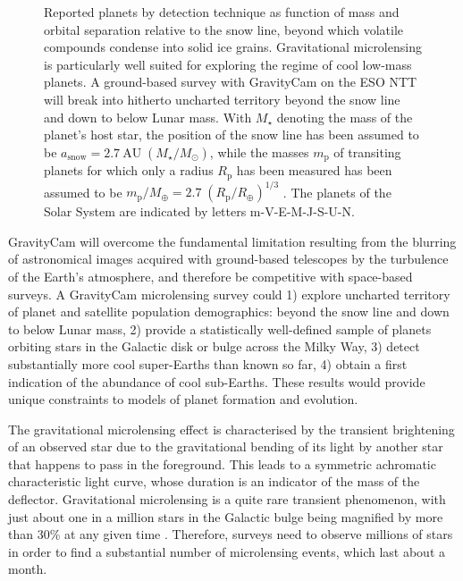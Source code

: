 \documentclass{pasa}%
\begin{document}
\begin{figure}
\centering
{}
\protect\caption{Reported planets by detection technique \citep{exoplanet:encyclopedia} as function of mass and orbital separation relative to the snow line, beyond which volatile compounds condense into solid ice grains. Gravitational microlensing is particularly well suited for exploring the regime of cool low-mass planets. A ground-based survey with \mbox{GravityCam} on the ESO NTT will break into hitherto uncharted territory beyond the snow line and down to below Lunar mass. With $M_\star$ denoting the mass of the planet's host star, the position of the snow line has been assumed to be $a_\mathrm{snow} = 2.7~\mbox{AU}\;(M_\star/M_\odot)$, while the masses $m_\mathrm{p}$ of transiting planets for which only a radius $R_\mathrm{p}$ has been measured has been assumed to be $m_\mathrm{p}/M_\oplus = 2.7\;(R_\mathrm{p}/R_\oplus)^{1/3}$ \citep{Wolfgang+2016}. The planets of the Solar System are indicated by letters m-V-E-M-J-S-U-N.}
\label{fig:techniques}
\end{figure}



\mbox{GravityCam} will overcome the fundamental limitation resulting from the blurring of astronomical images acquired with ground-based telescopes by the turbulence of the Earth's atmosphere, and therefore be competitive with space-based surveys. A \mbox{GravityCam} microlensing survey could 1) explore uncharted territory of planet and satellite population demographics: beyond the snow line and down to below Lunar mass, 2) provide a statistically well-defined sample of planets orbiting stars in the Galactic disk or bulge across the Milky Way, 3) detect substantially more cool super-Earths than known so far, 4) obtain a first indication of the abundance of cool sub-Earths. These results would provide unique constraints to models of planet formation and evolution.

The gravitational microlensing effect is characterised by the transient brightening of an observed star due to the gravitational bending of its light by another star that happens to pass in the foreground. This leads to a symmetric achromatic characteristic light curve, whose duration is an indicator of the mass of the deflector. Gravitational microlensing is a quite rare transient phenomenon, with just about one in a million stars in the Galactic bulge being magnified by more than 30\% at any given time \citep{KirPac1994}. Therefore, surveys need to observe millions of stars in order to find a substantial number of microlensing events, which last about a month. 
\end{document}
